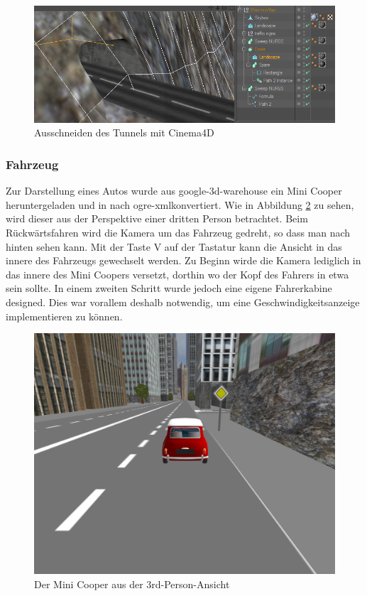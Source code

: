 \begin{figure}[H]
\centering 
\includegraphics[width=1\linewidth]{src/screenshot_cinema4d.png}
\caption{Ausschneiden des Tunnels mit Cinema4D} %
\label{cinema4d_ausschneiden_tunnel} %
\end{figure}

\newpage
\subsubsection{Fahrzeug}
Zur Darstellung eines Autos wurde aus \gls{google-3d-warehouse} ein Mini Cooper heruntergeladen und in nach \gls{ogre-xml}konvertiert. Wie in Abbildung \ref{screenshot_minicooper} zu sehen, wird dieser aus der Perspektive einer dritten Person betrachtet. Beim Rückwärtsfahren wird die Kamera um das Fahrzeug gedreht, so dass man nach hinten sehen kann. Mit der Taste V auf der Tastatur kann die Ansicht in das innere des Fahrzeugs gewechselt werden. Zu Beginn wirde die Kamera lediglich in das innere des Mini Coopers versetzt, dorthin wo der Kopf des Fahrers in etwa sein sollte. In einem zweiten Schritt wurde jedoch eine eigene Fahrerkabine designed. Dies war vorallem deshalb notwendig, um eine Geschwindigkeitsanzeige implementieren zu können. 
\begin{figure}[H]
\centering 
\includegraphics[width=1\linewidth]{src/screenshot_minicooper.png}
\caption{Der Mini Cooper aus der 3rd-Person-Ansicht} %
\label{screenshot_minicooper} %
\end{figure}

